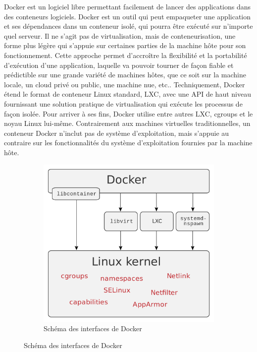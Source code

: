 \documentclass{article}
\begin{document}
Docker est un logiciel libre permettant facilement de lancer des applications dans des conteneurs logiciels.
\newline
Docker est un outil qui peut empaqueter une application et ses dépendances dans un conteneur isolé, qui pourra être exécuté sur n'importe quel serveur. Il ne s'agit pas de virtualisation, mais de conteneurisation, une forme plus légère qui s'appuie sur certaines parties de la machine hôte pour son fonctionnement. Cette approche permet d'accroître la flexibilité et la portabilité d’exécution d'une application, laquelle va pouvoir tourner de façon fiable et prédictible sur une grande variété de machines hôtes, que ce soit sur la machine locale, un cloud privé ou public, une machine nue, etc..
\newline
Techniquement, Docker étend le format de conteneur Linux standard, LXC, avec une API de haut niveau fournissant une solution pratique de virtualisation qui exécute les processus de façon isolée. Pour arriver à ses fins, Docker utilise entre autres LXC, cgroups et le noyau Linux lui-même. Contrairement aux machines virtuelles traditionnelles, un conteneur Docker n'inclut pas de système d'exploitation, mais s'appuie au contraire sur les fonctionnalités du système d’exploitation fournies par la machine hôte.

\begin{figure}[h!]
	\centering
  	\begin{subfigure}[b]{0.55\linewidth}
	\includegraphics[width=\linewidth]{dockeri.png}
	\caption{Schéma des interfaces de Docker}
  	\end{subfigure}
\end{figure}
\newpage
\end{document}
